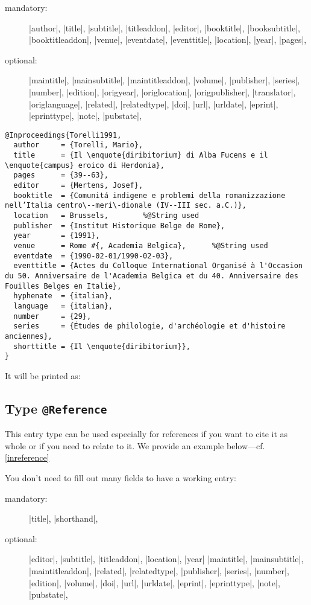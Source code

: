 \documentclass[a4paper,
10pt,
greek,
french,
spanish,
italian,
ngerman,
english
]{ltxdoc}
\begin{document}
\begin{description}
\item[mandatory:] 
|author|, |title|, |subtitle|, |titleaddon|,
|editor|,  |booktitle|, |booksubtitle|, |booktitleaddon|,
|venue|, |eventdate|, |eventtitle|,
|location|, |year|, |pages|, 
\item[optional:]
|maintitle|, |mainsubtitle|, |maintitleaddon|, |volume|, 
|publisher|, |series|, |number|, |edition|, 
|origyear|, |origlocation|, |origpublisher|, 
|translator|, |origlanguage|,
|related|, |relatedtype|,
|doi|, |url|, |urldate|, |eprint|, |eprinttype|, |note|, |pubstate|, 
\end{description}
 
 
 
 \begin{lstlisting}[style=bibentry,label=Torelli1991,caption={{@}Inproceedings\{Torelli1991,…\} }]
@Inproceedings{Torelli1991,
  author     = {Torelli, Mario},
  title      = {Il \enquote{diribitorium} di Alba Fucens e il \enquote{campus} eroico di Herdonia},
  pages      = {39--63},
  editor     = {Mertens, Josef},
  booktitle  = {Comunitá indigene e problemi della romanizzazione nell’Italia centro\--meri\-dionale (IV--III sec. a.C.)},
  location   = Brussels, 		%@String used
  publisher  = {Institut Historique Belge de Rome},
  year       = {1991},
  venue      = Rome #{, Academia Belgica},		%@String used
  eventdate  = {1990-02-01/1990-02-03},
  eventtitle = {Actes du Colloque International Organisé à l'Occasion du 50. Anniversaire de l'Academia Belgica et du 40. Anniversaire des Fouilles Belges en Italie},
  hyphenate  = {italian},
  language   = {italian},
  number     = {29},
  series     = {Études de philologie, d'archéologie et d'histoire anciennes},
  shorttitle = {Il \enquote{diribitorium}},
}
\end{lstlisting}
It will be printed as:
 

 \subsection{Type \texttt{@Reference}}\label{reference}
 This entry type can be used especially for references if you want to cite it as whole or if you need to relate to it. 
We provide an example below---cf. \cref{inreference}

You don’t need to fill out many fields to have a working entry:
\begin{description}
\item[mandatory:] |title|, |shorthand|,
\item[optional:] 
 |editor|, |subtitle|, |titleaddon|,
 |location|, |year|
|maintitle|, |mainsubtitle|, |maintitleaddon|,
|related|, |relatedtype|,
|publisher|, |series|, |number|, |edition|, |volume|,
|doi|, |url|, |urldate|, |eprint|, |eprinttype|, |note|, |pubstate|, 
\end{description}
\end{document}
